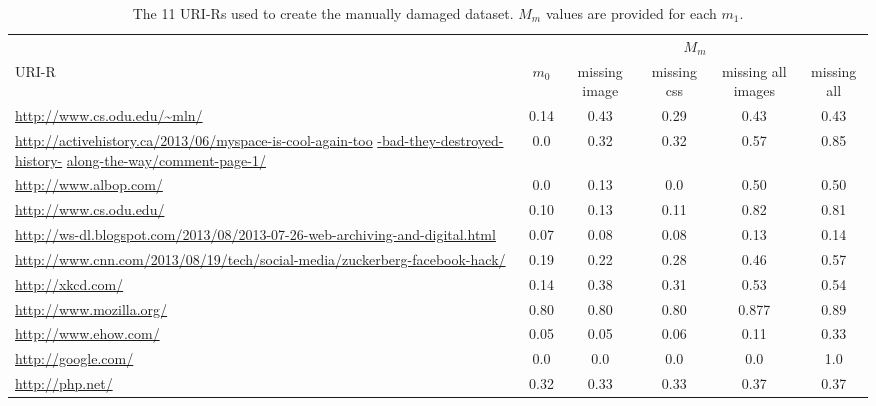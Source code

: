 \begin{table}[h!t]
\begin{tabular}{ p{6cm} | c |  c |  c |  c |  c }
	 & \multicolumn{5}{c}{$M_m$}\\
    URI-R & $m_0$ & missing image & missing css & missing all images & missing all\\
    	\hline
    	\hline
    \protect\url{http://www.cs.odu.edu/~mln/} & 0.14 & 0.43 & 0.29 & 0.43 & 0.43 \\
    	\hline 
    \url{http://activehistory.ca/2013/06/myspace-is-cool-again-too} \url{-bad-they-destroyed-history-} \url{along-the-way/comment-page-1/} & 0.0 & 0.32  & 0.32 & 0.57 & 0.85 \\
    	\hline
    \protect\url{http://www.albop.com/} & 0.0 & 0.13 & 0.0 & 0.50 & 0.50\\
    	\hline
    \protect\url{http://www.cs.odu.edu/} & 0.10 & 0.13 & 0.11 & 0.82 & 0.81 \\
    	\hline
    \protect\url{http://ws-dl.blogspot.com/2013/08/2013-07-26-web-archiving-and-digital.html} & 0.07 & 0.08 & 0.08 & 0.13 & 0.14 \\
    	\hline
    \protect\url{http://www.cnn.com/2013/08/19/tech/social-media/zuckerberg-facebook-hack/} & 0.19 & 0.22 & 0.28 & 0.46 & 0.57 \\
    	\hline
    \protect\url{http://xkcd.com/} & 0.14 & 0.38 & 0.31 & 0.53 & 0.54 \\
    	\hline
    \protect\url{http://www.mozilla.org/} & 0.80 & 0.80 & 0.80 & 0.877 & 0.89 \\
    	\hline
    \protect\url{http://www.ehow.com/} & 0.05 & 0.05 & 0.06 & 0.11 & 0.33 \\
    	\hline
    \protect\url{http://google.com/}  & 0.0 & 0.0 & 0.0 & 0.0 & 1.0  \\
    	\hline
    \protect\url{http://php.net/} & 0.32 & 0.33 & 0.33 & 0.37 & 0.37  \\
    	\hline
\end{tabular}
  \caption{The 11 URI-Rs used to create the manually damaged dataset. $M_m$ values are provided for each $m_1$.}
  \label{dataset}
\end{table}


